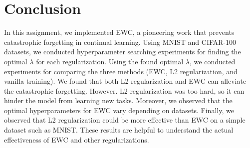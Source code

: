 \documentclass[final]{cvpr}
\begin{document}
\section{Conclusion}
In this assignment, we implemented EWC, a pioneering work that prevents catastrophic forgetting in continual learning. Using MNIST and CIFAR-100 datasets, we conducted hyperparameter searching experiments for finding the optimal $\lambda$ for each regularization. Using the found optimal $\lambda$, we conducted experiments for comparing the three methods (EWC, L2 regularization, and vanilla training). We found that both L2 regularization and EWC can alleviate the catastrophic forgetting. However. L2 regularization was too hard, so it can hinder the model from learning new tasks.
Moreover, we observed that the optimal hyperparameters for EWC vary depending on datasets. Finally, we observed that L2 regularization could be more effective than EWC on a simple dataset such as MNIST. These results are helpful to understand the actual effectiveness of EWC and other regularizations.


{\small


}
\end{document}
